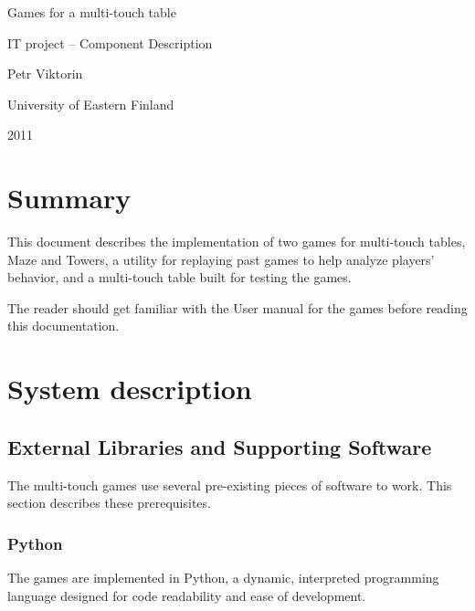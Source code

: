 \documentclass[a4paper,11pt]{article}
\begin{document}
\vspace*{3cm}

\begin{center}
{
    \huge Games for a multi-touch table

    \vspace{0.5em}

    \large IT project – Component Description
}

\vspace{3em}

Petr Viktorin

University of Eastern Finland

2011
\end{center}

\vspace*{2.718\fill}

\newpage

\tableofcontents

\newpage

\section{Summary}

This document describes the implementation of two games for
multi-touch tables, Maze and Towers, a utility for replaying past games to
help analyze players' behavior, and a multi-touch table built for testing the
games.

The reader should get familiar with the User manual for the games before
reading this documentation.

\section{System description}

\subsection{External Libraries and Supporting Software}
\label{dependencies}

The multi-touch games use several pre-existing pieces of software to work.
This section describes these prerequisites.

\subsubsection{Python}

The games are implemented in Python, a dynamic, interpreted programming
language designed for code readability and ease of development.
\end{document}
